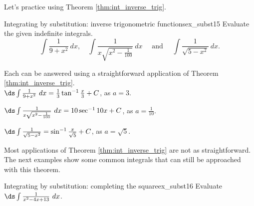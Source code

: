 Let's practice using Theorem \ref{thm:int_inverse_trig}.\\

\begin{example}{Integrating by substitution: inverse trigonometric functions}{ex_subst15}
{Evaluate the given indefinite integrals.
$$\int \frac{1}{9+x^2}\ dx,\quad \int \frac{1}{x\sqrt{x^2-\frac{1}{100}}}\ dx\quad \text{ and }\quad  \int \frac{1}{\sqrt{5-x^2}}\ dx.$$
}
\end{example}

\begin{solution}
{Each can be answered using a straightforward application of Theorem \ref{thm:int_inverse_trig}.\\

$\ds \int \frac{1}{9+x^2}\ dx = \frac13\tan^{-1} \frac x3 + C$, as $a = 3$.\vskip 10pt

$\ds \int  \frac{1}{x\sqrt{x^2-\frac{1}{100}}}\ dx = 10\sec^{-1}10x + C$, as $a = \frac1{10}$.\vskip 10pt

$\ds \int \frac{1}{\sqrt{5-x^2}} = \sin^{-1}\frac{x}{\sqrt{5}}+C$, as $a = \sqrt{5}$.\\
}
\end{solution}



\enlargethispage{2\baselineskip}
Most applications of Theorem \ref{thm:int_inverse_trig} are not as straightforward. The next examples show some common integrals that can still be approached with this theorem.\\

\begin{example}{Integrating by substitution: completing the square}{ex_subst16}
{Evaluate $\ds \int\frac{1}{x^2-4x+13}\ dx$.}
\end{example}

